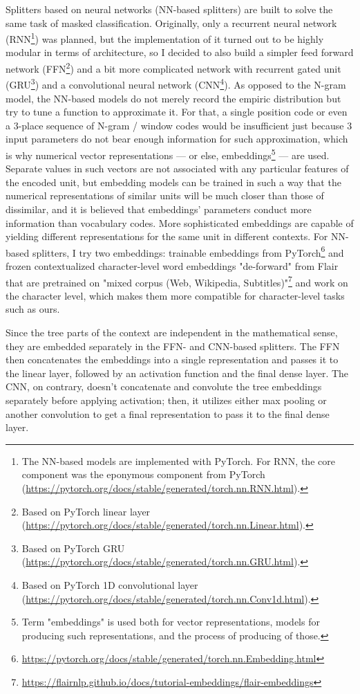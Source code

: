 \documentclass[11pt]{article}
\begin{document}
Splitters based on neural networks (NN-based splitters) are built to solve the same task of masked classification. Originally, only a recurrent neural network (RNN\footnote{The NN-based models are implemented with PyTorch. For RNN, the core component was the eponymous component from PyTorch (\url{https://pytorch.org/docs/stable/generated/torch.nn.RNN.html}).}) was planned, but the implementation of it turned out to be highly modular in terms of architecture, so I decided to also build a simpler feed forward network (FFN\footnote{Based on PyTorch linear layer (\url{https://pytorch.org/docs/stable/generated/torch.nn.Linear.html}).}) and a bit more complicated network with recurrent gated unit (GRU\footnote{Based on PyTorch GRU (\url{https://pytorch.org/docs/stable/generated/torch.nn.GRU.html}).}) and a convolutional neural network (CNN\footnote{Based on PyTorch 1D convolutional layer (\url{https://pytorch.org/docs/stable/generated/torch.nn.Conv1d.html}).}). As opposed to the N-gram model, the NN-based models do not merely record the empiric distribution but try to tune a function to approximate it. For that, a single position code or even a 3-place sequence of N-gram / window codes would be insufficient just because 3 input parameters do not bear enough information for such approximation, which is why numerical vector representations --- or else, embeddings\footnote{Term "embeddings" is used both for  vector representations, models for producing such representations, and the process of producing of those.} --- are used. Separate values in such vectors are not associated with any particular features of the encoded unit, but embedding models can be trained in such a way that the numerical representations of similar units will be much closer than those of dissimilar, and it is believed that embeddings' parameters conduct more information than vocabulary codes. More sophisticated embeddings are capable of yielding different representations for the same unit in different contexts. For NN-based splitters, I try two embeddings: trainable embeddings from PyTorch\footnote{\url{https://pytorch.org/docs/stable/generated/torch.nn.Embedding.html}} and frozen contextualized character-level word embeddings "de-forward" from Flair \cite{akbik2018coling} that are pretrained on "mixed corpus (Web, Wikipedia, Subtitles)"\footnote{\url{https://flairnlp.github.io/docs/tutorial-embeddings/flair-embeddings}} and work on the character level, which makes them more compatible for character-level tasks such as ours.
	
Since the tree parts of the context are independent in the mathematical sense, they are embedded separately in the FFN- and CNN-based splitters. The FFN then concatenates the embeddings into a single representation and passes it to the linear layer, followed by an activation function and the final dense layer. The CNN, on contrary, doesn't concatenate and convolute the tree embeddings separately before applying activation; then, it utilizes either max pooling or another convolution to get a final representation to pass it to the final dense layer.
\end{document}
